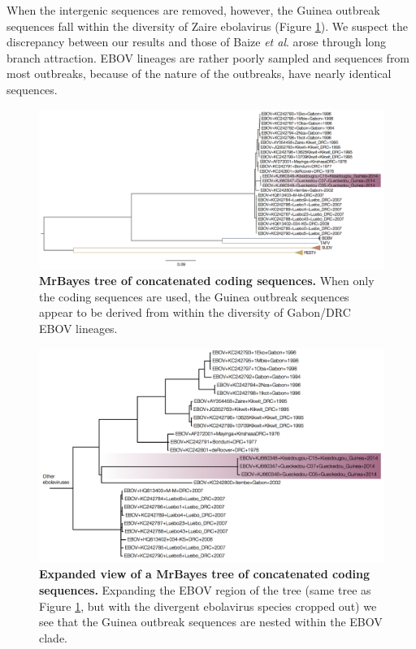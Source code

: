 \documentclass[11pt,oneside,letterpaper]{article}
\begin{document}
When the intergenic sequences are removed, however, the Guinea outbreak sequences fall within the diversity of Zaire ebolavirus (Figure \ref{MBtreeCDS}).
We suspect the discrepancy between our results and those of Baize \textit{et al}. \cite{baize2014} arose through long branch attraction.
EBOV lineages are rather poorly sampled and sequences from most outbreaks, because of the nature of the outbreaks, have nearly identical sequences.

\begin{figure}[h!]
\centering  
\includegraphics[width=1\textwidth]  {figures/ebolavirus_cds_mb_tree.png}
\caption{\textbf{MrBayes tree of concatenated coding sequences.}
When only the coding sequences are used, the Guinea outbreak sequences appear to be derived from within the diversity of Gabon/DRC EBOV lineages.}
\label{MBtreeCDS}
\end{figure}

\begin{figure}[h!]
\centering  
\includegraphics[width=1\textwidth]  {figures/EBOV_cds_mb_tree.png}
\caption{\textbf{Expanded view of a MrBayes tree of concatenated coding sequences.}
Expanding the EBOV region of the tree (same tree as Figure \ref{MBtreeCDS}, but with the divergent ebolavirus species cropped out) we see that the Guinea outbreak sequences are nested within the EBOV clade.}
\label{MBtreeCDSzoomed}
\end{figure}
\end{document}
